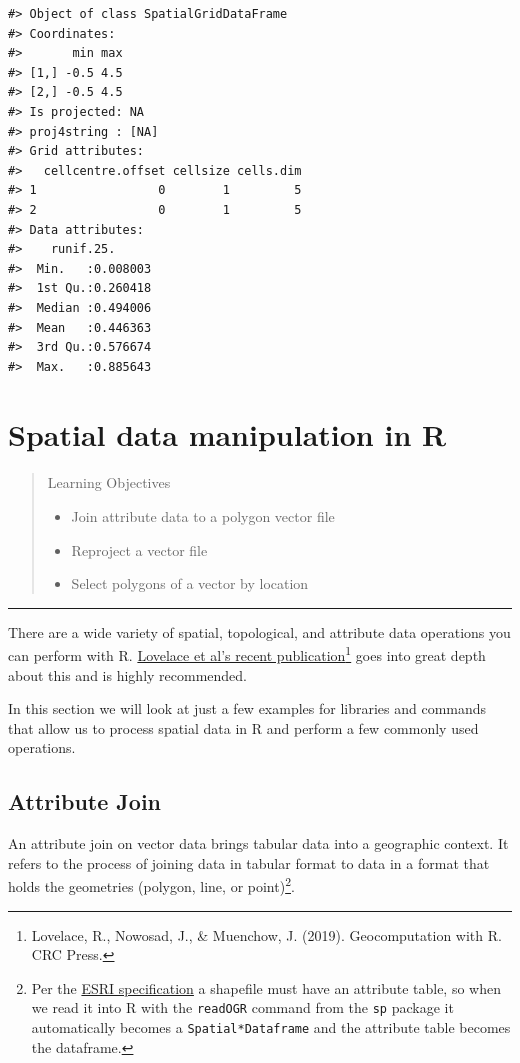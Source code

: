\documentclass[]{book}
\providecommand{\tightlist}{%
  \setlength{\itemsep}{0pt}\setlength{\parskip}{0pt}}
\let\rmarkdownfootnote\footnote%
\def\footnote{\protect\rmarkdownfootnote}
\begin{document}
\begin{verbatim}
#> Object of class SpatialGridDataFrame
#> Coordinates:
#>       min max
#> [1,] -0.5 4.5
#> [2,] -0.5 4.5
#> Is projected: NA 
#> proj4string : [NA]
#> Grid attributes:
#>   cellcentre.offset cellsize cells.dim
#> 1                 0        1         5
#> 2                 0        1         5
#> Data attributes:
#>    runif.25.       
#>  Min.   :0.008003  
#>  1st Qu.:0.260418  
#>  Median :0.494006  
#>  Mean   :0.446363  
#>  3rd Qu.:0.576674  
#>  Max.   :0.885643
\end{verbatim}

\chapter{Spatial data manipulation in R}\label{spatialops}

\begin{quote}
Learning Objectives

\begin{itemize}
\tightlist
\item
  Join attribute data to a polygon vector file
\item
  Reproject a vector file
\item
  Select polygons of a vector by location
\end{itemize}
\end{quote}

\begin{center}\rule{0.5\linewidth}{\linethickness}\end{center}

There are a wide variety of spatial, topological, and attribute data
operations you can perform with R.
\href{https://geocompr.robinlovelace.net}{Lovelace et al's recent
publication}\footnote{Lovelace, R., Nowosad, J., \& Muenchow, J. (2019).
  Geocomputation with R. CRC Press.} goes into great depth about this
and is highly recommended.

In this section we will look at just a few examples for libraries and
commands that allow us to process spatial data in R and perform a few
commonly used operations.

\section{Attribute Join}\label{attribute-join}

An attribute join on vector data brings tabular data into a geographic
context. It refers to the process of joining data in tabular format to
data in a format that holds the geometries (polygon, line, or
point)\footnote{Per the
  \href{http://www.esri.com/library/whitepapers/pdfs/shapefile.pdf}{ESRI
  specification} a shapefile must have an attribute table, so when we
  read it into R with the \texttt{readOGR} command from the \texttt{sp}
  package it automatically becomes a \texttt{Spatial*Dataframe} and the
  attribute table becomes the dataframe.}.
\end{document}
